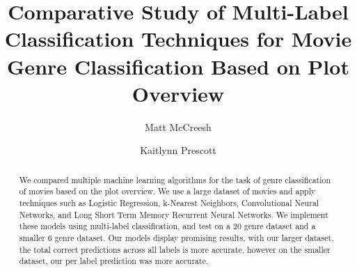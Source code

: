 \documentclass[sigconf]{acmart}
\begin{document}
%
\title{Comparative Study of Multi-Label Classification Techniques for Movie Genre Classification Based on Plot Overview}

%
\author{Matt McCreesh}

\author{Kaitlynn Prescott}

\renewcommand{\shortauthors}{Trovato and Tobin, et al.}
\linebreak\linebreak
%

\begin{abstract}
\noindent We compared multiple machine learning algorithms for the task of genre classification of movies based on the plot overview. We use a large dataset of movies and apply techniques such as Logistic Regression, k-Nearest Neighbors, Convolutional Neural Networks, and Long Short Term Memory Recurrent Neural Networks. We implement these models using multi-label classification, and test on a 20 genre dataset and a smaller 6 genre dataset. Our models display promising results, with our larger dataset, the total correct predictions across all labels is more accurate, however on the smaller dataset, our per label prediction was more accurate.
\end{abstract}


%
\maketitle
\end{document}
